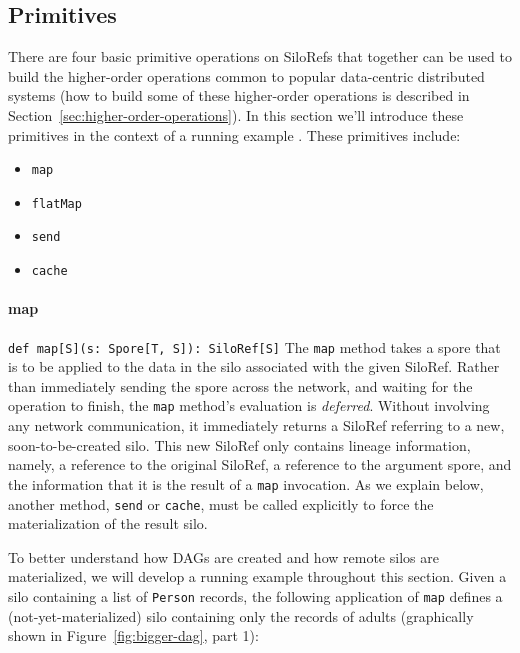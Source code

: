 \documentclass[preprint]{sigplanconf}
\theoremstyle{definition}
\theoremstyle{definition}
\begin{document}
\subsection{Primitives}
\label{sec:primitives}

There are four basic primitive operations on SiloRefs that together can be used 
to build the  higher-order operations common to 
popular data-centric distributed systems (how to build some of these 
higher-order operations is described in 
Section~\ref{sec:higher-order-operations}). In this section we'll introduce 
these primitives in the context of a running example . These 
primitives include:

\begin{itemize}[noitemsep,nolistsep]
\item \verb|map|
\item \verb|flatMap|
\item \verb|send|
\item \verb|cache|
\end{itemize}


\paragraph{map}%
%
\texttt{def map[S](s: Spore[T, S]): SiloRef[S]} \newline
%
The \verb|map| method takes a spore that is to be applied to the data in the
silo associated with the given SiloRef. Rather than immediately sending the
spore across the network, and waiting for the operation to finish, the
\verb|map| method's evaluation is \emph{deferred}. Without involving any network
communication, it immediately returns a SiloRef referring to a new,
soon-to-be-created  silo. This new SiloRef 
only contains lineage information, namely, a reference to the original SiloRef, 
a reference to the argument spore, and the information that it is the result of 
a \verb|map| invocation. As we explain below, another method, \verb|send| or 
\verb|cache|, must be called explicitly to force the materialization of the 
result silo.

To better understand how DAGs are created and how remote silos are
materialized, we will develop a running example  throughout this section. Given
a silo containing a list of \verb|Person| records, the following application of
\verb|map| defines a (not-yet-materialized) silo containing only the records of
adults (graphically shown in Figure~\ref{fig:bigger-dag}, part 1):
\end{document}
